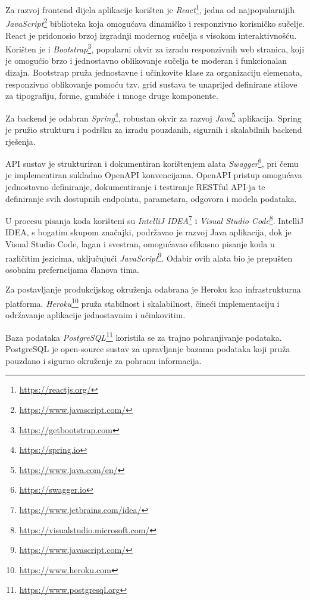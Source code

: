 			 Za razvoj frontend dijela aplikacije korišten je \textit{React}\footnote{\url{https://reactjs.org/}}, jedna od najpopularnijih \textit{JavaScript}\footnote{\url{https://www.javascript.com/}} biblioteka koja omogućava dinamičko i responzivno korisničko sučelje. React je pridonosio brzoj izgradnji modernog sučelja s visokom interaktivnošću.
			 Korišten je i \textit{Bootstrap}\footnote{\url{https://getbootstrap.com}}, popularni okvir za izradu responzivnih web stranica, koji je omogućio brzo i jednostavno oblikovanje sučelja te moderan i funkcionalan dizajn. Bootstrap pruža jednostavne i učinkovite klase za organizaciju elemenata, responzivno oblikovanje pomoću tzv. grid sustava te unaprijed definirane stilove za tipografiju, forme, gumbiće i mnoge druge komponente.
			 
			 Za backend je odabran \textit{Spring}\footnote{\url{https://spring.io}}, robustan okvir za razvoj \textit{Java}\footnote{\url{https://www.java.com/en/}} aplikacija. Spring je pružio strukturu i podršku za izradu pouzdanih, sigurnih i skalabilnih backend rješenja.

			 API sustav je strukturiran i dokumentiran korištenjem alata \textit{Swagger}\footnote{\url{https://swagger.io}}, pri čemu je implementiran sukladno OpenAPI konvencijama. OpenAPI pristup omogućava jednostavno definiranje, dokumentiranje i testiranje RESTful API-ja te definiranje svih dostupnih endpointa, parametara, odgovora i modela podataka.
			 
			 U procesu pisanja koda korišteni su \textit{IntelliJ IDEA}\footnote{\url{https://www.jetbrains.com/idea/}} i \textit{Visual Studio Code}\footnote{\url{https://visualstudio.microsoft.com/}}. IntelliJ IDEA, s bogatim skupom značajki, podržavao je razvoj Java aplikacija, dok je Visual Studio Code, lagan i svestran, omogućavao efikasno pisanje koda u različitim jezicima, uključujući \textit{JavaScript}\footnote{\url{https://www.javascript.com/}}.
			 Odabir ovih alata bio je prepušten osobnim preferncijama članova tima.

			 Za postavljanje produkcijskog okruženja odabrana je Heroku kao infrastrukturna platforma. \textit{Heroku}\footnote{\url{https://www.heroku.com}} pruža stabilnost i skalabilnost, čineći implementaciju i održavanje aplikacije jednostavnim i učinkovitim.
			 
			 Baza podataka \textit{PostgreSQL}\footnote{\url{https://www.postgresql.org}} koristila se za trajno pohranjivanje podataka. PostgreSQL je open-source sustav za upravljanje bazama podataka koji pruža pouzdano i sigurno okruženje za pohranu informacija.
			 
